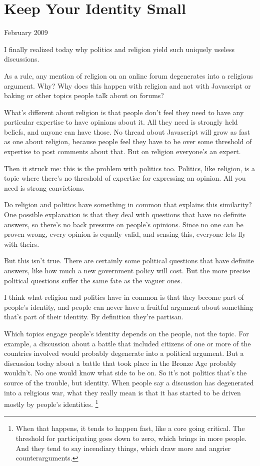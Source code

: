 \chapter{Keep Your Identity Small  }

February 2009

I finally realized today why politics and religion yield such uniquely
useless discussions.

As a rule, any mention of religion on an online forum degenerates into a
religious argument. Why? Why does this happen with religion and not with
Javascript or baking or other topics people talk about on forums?

What's different about religion is that people don't feel they need to
have any particular expertise to have opinions about it. All they need
is strongly held beliefs, and anyone can have those. No thread about
Javascript will grow as fast as one about religion, because people feel
they have to be over some threshold of expertise to post comments about
that. But on religion everyone's an expert.

Then it struck me: this is the problem with politics too. Politics, like
religion, is a topic where there's no threshold of expertise for
expressing an opinion. All you need is strong convictions.

Do religion and politics have something in common that explains this
similarity? One possible explanation is that they deal with questions
that have no definite answers, so there's no back pressure on people's
opinions. Since no one can be proven wrong, every opinion is equally
valid, and sensing this, everyone lets fly with theirs.

But this isn't true. There are certainly some political questions that
have definite answers, like how much a new government policy will cost.
But the more precise political questions suffer the same fate as the
vaguer ones.

I think what religion and politics have in common is that they become
part of people's identity, and people can never have a fruitful argument
about something that's part of their identity. By definition they're
partisan.

Which topics engage people's identity depends on the people, not the
topic. For example, a discussion about a battle that included citizens
of one or more of the countries involved would probably degenerate into
a political argument. But a discussion today about a battle that took
place in the Bronze Age probably wouldn't. No one would know what side
to be on. So it's not politics that's the source of the trouble, but
identity. When people say a discussion has degenerated into a religious
war, what they really mean is that it has started to be driven mostly by
people's identities. \footnote{When that happens, it tends to happen fast, like a core going
critical. The threshold for participating goes down to zero, which
brings in more people. And they tend to say incendiary things, which
draw more and angrier counterarguments.}

